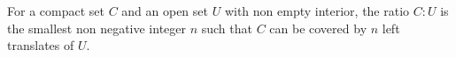 For a compact set $C$ and an open set $U$ with non empty interior, the ratio $C:U$ is the smallest non negative integer $n$ such that $C$ can be covered by $n$ left translates of $U$.
